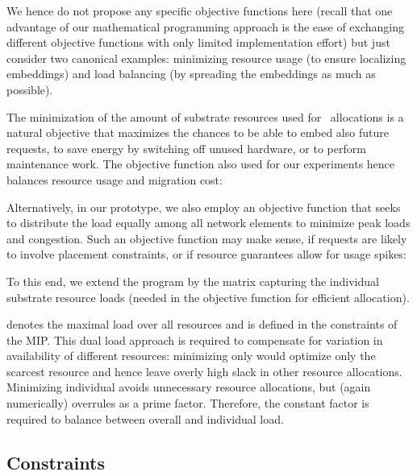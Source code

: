 \documentclass[conference,10pt]{IEEEtran}
\newcommand{\CloudNet}{\text{CloudNet}}
\begin{document}
We hence do not propose any specific objective functions here (recall that one advantage of our mathematical programming approach is the ease of exchanging different objective functions with only limited implementation effort) but just consider two canonical examples:
minimizing resource usage (to ensure localizing embeddings) and load balancing (by spreading the embeddings as much as possible).


The minimization of the amount of substrate resources used for \CloudNet\ allocations is a natural objective that maximizes the chances to be able to embed also future requests, to save energy by switching off unused hardware, or to perform maintenance work. The objective function also used for our experiments hence balances resource usage and migration cost:

\begin{footnotesize}


\end{footnotesize}


Alternatively, in our prototype, we also employ an objective function that seeks to
distribute the load equally among all network elements to minimize
peak loads and congestion.
Such an objective function may make sense, if requests are likely to involve placement constraints, or if resource guarantees allow for usage spikes:

\begin{footnotesize}


\end{footnotesize}


To this end, we extend the program by the
 matrix capturing the individual substrate resource loads
(needed in the objective function for efficient allocation).

denotes the maximal load over all resources and is defined in the
constraints of the MIP.
This dual load approach is required to compensate for variation in availability of different resources:
minimizing only  would optimize only the  scarcest resource and hence leave overly high slack in other resource allocations.
Minimizing individual  avoids unnecessary resource allocations, but (again numerically) overrules  as a prime factor.
Therefore, the constant factor  is required to balance between overall and individual load.


\subsection{Constraints}\label{ssec:mip:prog:constraints}
\end{document}
